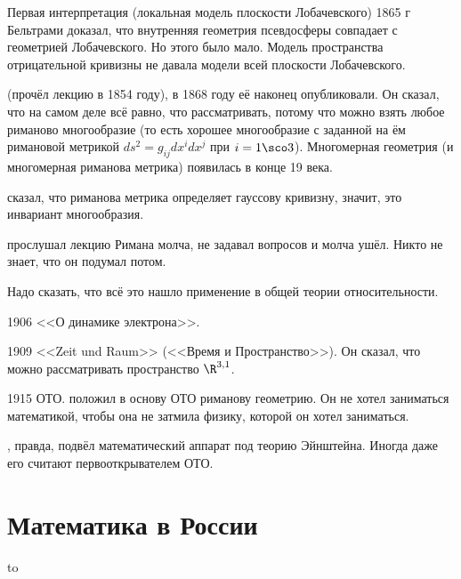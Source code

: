 \documentclass[a4paper,oneside,fleqn,10pt]{article}
\begin{document}
Первая интерпретация (локальная модель плоскости Лобачевского) 1865 г Бельтрами
доказал, что внутренняя геометрия псевдосферы совпадает с геометрией Лобачевского.
Но этого было мало. Модель пространства отрицательной кривизны не давала
модели всей плоскости Лобачевского.

 (прочёл лекцию в 1854 году), в 1868 году её наконец опубликовали.
Он сказал, что на самом деле всё равно, что рассматривать, потому что
можно взять любое риманово многообразие (то есть хорошее многообразие
с заданной на ём римановой метрикой $ds^2 = g_{ij}dx^idx^j$ при $i = 1\sco 3$).
Многомерная геометрия (и многомерная риманова метрика) появилась в конце 19 века.

 сказал, что риманова метрика определяет гауссову кривизну,
значит, это инвариант многообразия.

 прослушал лекцию Римана молча, не задавал вопросов и молча ушёл.
Никто не знает, что он подумал потом.

Надо сказать, что всё это нашло применение в общей теории относительности.

1906  <<О динамике электрона>>.

1909  <<Zeit und Raum>> (<<Время и Пространство>>).
Он сказал, что можно рассматривать пространство $\R^{3,1}$.

1915 ОТО.  положил в основу ОТО риманову геометрию.
Он не хотел заниматься математикой, чтобы она не затмила физику,
которой он хотел заниматься.

, правда, подвёл математический аппарат под теорию Эйнштейна.
Иногда даже его считают первооткрывателем ОТО.



\section{Математика в России}


\medskip
\hbox to 
\medskip
\end{document}
